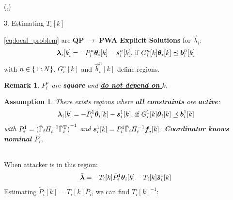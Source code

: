 \documentclass[presentation]{beamer}
\newtheorem{assumption}{Assumption}%
\newtheorem{remark}{Remark}%
\begin{document}
\begin{frame}
  \begin{textblock}{5.1}(\seccol,\secrow)
    \begin{block}{3. Estimating $T_{i}[k]$}
      \begin{center}
          \centering
          \begin{minipage}[c]{.95\textwidth}
            \eqref{eq:local_problem} are {\bf QP}  $\to$ {\bf PWA Explicit Solutions} for $\vec{\lambda}_{i}$:
            \begin{equation}
              \centering
              \begin{aligned}\label{eq:lambdafuntheta}
                \lambdaik=
                -P_{i}^{n}\thetaik-\vec{s}_{i}^{n}[k]\text{, if}\ G_{i}^{n}[k]\thetaik \preceq \vec{b}_{i}^{n}[k]
              \end{aligned}
            \end{equation}
            with $n\in\{1\mathbin{:} N\}$. $G_{i}^{n}[k]$ and $\vec{b}_{i}^{n}[k]$ define regions.
            \begin{remark}\label{rmk:p_constant}
              {\color{ietr_brightblue} $P^{n}_{i}$ are \textbf{square} and \underline{\textbf{do not depend on} $k$}.}
            \end{remark}
            \vspace{1.cm}
            \begin{assumption}
              There exists regions where \textbf{all constraints} are \textbf{active}:
              \begin{equation}
                \vec{\lambda}_{i}[k]=-P_{i}^{1}\thetaik-\vec{s}_{i}^{1}[k]\text{, if}\ G_{i}^{1}[k]\thetaik \preceq \vec{b}_{i}^{1}[k]
              \end{equation}
              with ${P_{i}^{1}={(\bar{\Gamma}_{i}H_{i}^{-1}\bar{\Gamma}_{i}^{\mathrm{T}})}^{-1}}$ and ${\vec{s}_{i}^{1}[k]=P_{i}^{1}\bar{\Gamma}_{i}H_{i}^{-1}\fik}$.
              \textbf{Coordinator knows nominal $\bar{P}_{i}^{1}$}.
            \end{assumption}
            \\[1ex]
            When attacker is in this region:
            \begin{equation}
              \tilde{\vec{\lambda}}=-T_{i}[k]\bar{P}_{i}^{1}\thetaik-T_{i}[k]\bar{\vec{s}}_{i}^{1}[k]
            \end{equation}
            \vspace{1ex}
            Estimating ${\tilde{P}_{i}[k]=T_{i}[k]\bar{P}_{i}}$, we can find ${T_{i}[k]}^{-1}$:
            \begin{equation}

\end{equation}
\end{minipage}
\end{center}
\end{block}
\end{textblock}
\end{frame}
\end{document}
